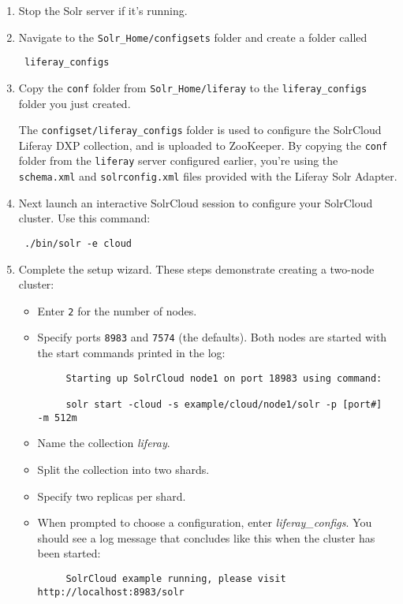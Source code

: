 \begin{enumerate}
\def\labelenumi{\arabic{enumi}.}
\item
  Stop the Solr server if it's running.
\item
  Navigate to the \texttt{Solr\_Home/configsets} folder and create a
  folder called

\begin{verbatim}
 liferay_configs
\end{verbatim}
\item
  Copy the \texttt{conf} folder from \texttt{Solr\_Home/liferay} to the
  \texttt{liferay\_configs} folder you just created.

  The \texttt{configset/liferay\_configs} folder is used to configure
  the SolrCloud Liferay DXP collection, and is uploaded to ZooKeeper. By
  copying the \texttt{conf} folder from the \texttt{liferay} server
  configured earlier, you're using the \texttt{schema.xml} and
  \texttt{solrconfig.xml} files provided with the Liferay Solr Adapter.
\item
  Next launch an interactive SolrCloud session to configure your
  SolrCloud cluster. Use this command:

\begin{verbatim}
 ./bin/solr -e cloud
\end{verbatim}
\item
  Complete the setup wizard. These steps demonstrate creating a two-node
  cluster:

  \begin{itemize}
  \item
    Enter \texttt{2} for the number of nodes.
  \item
    Specify ports \texttt{8983} and \texttt{7574} (the defaults). Both
    nodes are started with the start commands printed in the log:

\begin{verbatim}
     Starting up SolrCloud node1 on port 18983 using command:

     solr start -cloud -s example/cloud/node1/solr -p [port#]  -m 512m
\end{verbatim}
  \item
    Name the collection \emph{liferay}.
  \item
    Split the collection into two shards.
  \item
    Specify two replicas per shard.
  \item
    When prompted to choose a configuration, enter
    \emph{liferay\_configs}. You should see a log message that concludes
    like this when the cluster has been started:

\begin{verbatim}
     SolrCloud example running, please visit http://localhost:8983/solr
\end{verbatim}
  \end{itemize}
\end{enumerate}

